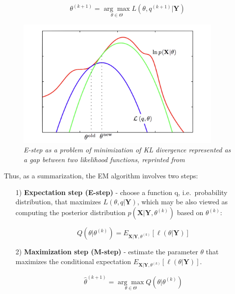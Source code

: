 \begin{equation}
    \theta^{(k+1)} = \underset{\theta \in \Theta}{\arg\max} L(\theta, q^{(k+1)}|\textbf{Y})
\end{equation}

\begin{figure}[ht]

\begin{center}
	\includegraphics[width=0.9\textwidth]{Figs/Loglike.png}
\end{center}

\caption[Construction of log-likelihood lower bound]{\textit{E-step as a problem of minimization of KL divergence represented as a gap between two likelihood functions, reprinted from \citep{Bishop2006}}}
\label{fig:Loglike}
\end{figure}

\noindent Thus, as a summarization, the EM algorithm involves two steps:

\begin{itemize}
\item[1)] \textbf{Expectation step (E-step)} - choose a function q, i.e.\ probability distribution, that maximizes $L(\theta, q|\textbf{Y})$, which may be also viewed as 
                                               computing the posterior distribution $p(\textbf{X}|\textbf{Y},\theta^{(k)})$ based on $\theta^{(k)}$:

\begin{equation}
    Q(\theta|\theta^{(k)}) = E_{\textbf{X}|\textbf{Y},\theta^{(k)}} [\ell(\theta|\textbf{Y})]
\end{equation}

\item[2)] \textbf{Maximization step (M-step)} - estimate the parameter $\theta$ that maximizes the conditional expectation $E_{\textbf{X}|\textbf{Y},\theta^{(k)}} [\ell(\theta|\textbf{Y})]$.

\begin{equation}
    \hat{\theta}^{(k+1)} = \underset{\theta \in \Theta}{\arg\max} Q(\theta|\theta^{(k)}) 
\end{equation}

\end{itemize}

